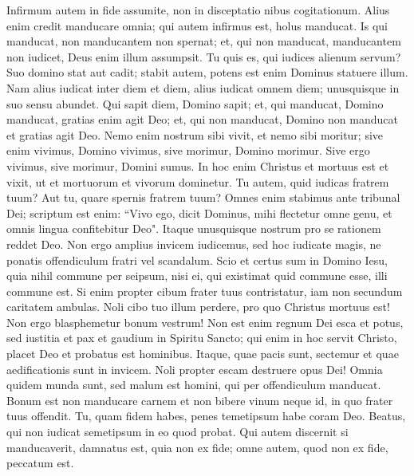 \begin{biblechapter}  
\verse Infirmum autem in fide assumite, non in disceptatio nibus cogitationum. 
\verse Alius enim credit manducare omnia; qui autem infirmus est, holus manducat.  
\verse Is qui manducat, non manducantem non spernat; et, qui non manducat, manducantem non iudicet, Deus enim illum assumpsit. 
\verse Tu quis es, qui iudices alienum servum? Suo domino stat aut cadit; stabit autem, potens est enim Dominus statuere illum. 
\verse Nam alius iudicat inter diem et diem, alius iudicat omnem diem; unusquisque in suo sensu abundet. 
\verse Qui sapit diem, Domino sapit; et, qui manducat, Domino manducat, gratias enim agit Deo; et, qui non manducat, Domino non manducat et gratias agit Deo. 
\verse Nemo enim nostrum sibi vivit, et nemo sibi moritur; 
\verse sive enim vivimus, Domino vivimus, sive morimur, Domino morimur. Sive ergo vivimus, sive morimur, Domini sumus. 
\verse In hoc enim Christus et mortuus est et vixit, ut et mortuorum et vivorum dominetur. 
\verse Tu autem, quid iudicas fratrem tuum? Aut tu, quare spernis fratrem tuum? Omnes enim stabimus ante tribunal Dei; 
\verse scriptum est enim: “Vivo ego, dicit Dominus, mihi flectetur omne genu, et omnis lingua confitebitur Deo". 
\verse Itaque unusquisque nostrum pro se rationem reddet Deo. 
\verse Non ergo amplius invicem iudicemus, sed hoc iudicate magis, ne ponatis offendiculum fratri vel scandalum. 
\verse Scio et certus sum in Domino Iesu, quia nihil commune per seipsum, nisi ei, qui existimat quid commune esse, illi commune est. 
\verse Si enim propter cibum frater tuus contristatur, iam non secundum caritatem ambulas. Noli cibo tuo illum perdere, pro quo Christus mortuus est! 
\verse Non ergo blasphemetur bonum vestrum! 
\verse Non est enim regnum Dei esca et potus, sed iustitia et pax et gaudium in Spiritu Sancto; 
\verse qui enim in hoc servit Christo, placet Deo et probatus est hominibus. 
\verse Itaque, quae pacis sunt, sectemur et quae aedificationis sunt in invicem. 
\verse Noli propter escam destruere opus Dei! Omnia quidem munda sunt, sed malum est homini, qui per offendiculum manducat.  
\verse Bonum est non manducare carnem et non bibere vinum neque id, in quo frater tuus offendit. 
\verse Tu, quam fidem habes, penes temetipsum habe coram Deo. Beatus, qui non iudicat semetipsum in eo quod probat. 
\verse Qui autem discernit si manducaverit, damnatus est, quia non ex fide; omne autem, quod non ex fide, peccatum est. 
\end{biblechapter}

